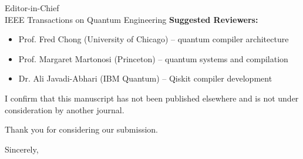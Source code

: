 \documentclass[11pt]{letter}
\begin{document}
\begin{letter}{Editor-in-Chief\\
IEEE Transactions on Quantum Engineering}
\textbf{Suggested Reviewers:}
\begin{itemize}
    \item Prof. Fred Chong (University of Chicago) -- quantum compiler architecture
    \item Prof. Margaret Martonosi (Princeton) -- quantum systems and compilation
    \item Dr. Ali Javadi-Abhari (IBM Quantum) -- Qiskit compiler development
\end{itemize}

I confirm that this manuscript has not been published elsewhere and is not under consideration by another journal.

Thank you for considering our submission.

\closing{Sincerely,}

\end{letter}
\end{document}
